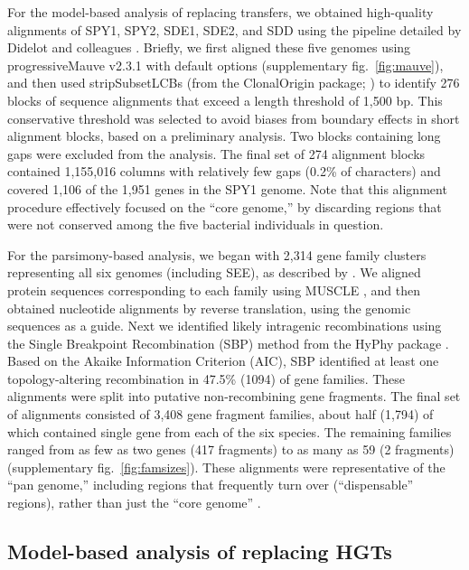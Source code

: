 \documentclass[12pt]{article}
\begin{document}
For the model-based analysis of replacing transfers, we obtained
high-quality alignments of SPY1, SPY2, SDE1, SDE2, and SDD using the
pipeline detailed by Didelot and colleagues
\citep{Didelot2007,Didelot2010}.  Briefly, we first aligned these five
genomes using progressiveMauve v2.3.1 \citep{Darling2004,Darling2010} with
default options (supplementary fig.\ \ref{fig:mauve}), and then used
stripSubsetLCBs (from the ClonalOrigin package; \citealp{Didelot2010}) to
identify 276 blocks of sequence alignments that exceed a length threshold
of 1,500 bp.  This conservative threshold was selected to avoid biases from
boundary effects in short alignment blocks, based on a preliminary
analysis.  Two blocks containing long gaps were excluded from the analysis.
The final set of 274 alignment blocks contained 1,155,016 columns with
relatively few gaps (0.2\% of characters) and covered 1,106 of the 1,951
genes in the SPY1 genome.  Note that this alignment procedure effectively
focused on the ``core genome,'' by discarding regions that were not
conserved among the five bacterial individuals in question.

For the parsimony-based analysis, we began with 2,314 gene family clusters
representing all six genomes (including SEE), as described by
\cite{Suzuki2011}.  We aligned protein sequences corresponding to each
family using MUSCLE \citep{Edgar2004a}, and then obtained nucleotide
alignments by reverse translation, using the genomic sequences as a guide.
Next we identified likely intragenic recombinations using the Single
Breakpoint Recombination (SBP) method from the HyPhy package
\citep{KosakovskyPond2006}.  Based on the Akaike Information Criterion
(AIC), SBP identified at least one topology-altering recombination in
47.5\% (1094) of gene families. These alignments were split into putative
non-recombining gene fragments.  The final set of alignments consisted of
3,408 gene fragment families, about half (1,794) of which contained
single gene from each of the six species.  The remaining families ranged
from as few as two genes (417 fragments) to as many as 59 (2 fragments)
(supplementary fig.\ \ref{fig:famsizes}).  These alignments were
representative of the ``pan genome,'' including regions that frequently
turn over (``dispensable'' regions), rather than just the ``core genome''
\citep[e.g.,][]{Tettelin2005,Lefebure2007}.

\subsection*{Model-based analysis of replacing HGTs}
\end{document}
